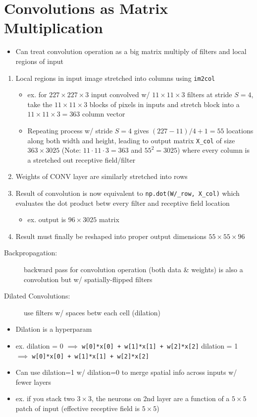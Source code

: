 \documentclass[a4paper,12pt]{article}
\begin{document}
\section{Convolutions as Matrix Multiplication}
\begin{itemize}
  \item Can treat convolution operation as a big matrix multiply of filters and local regions of input
\end{itemize}
\begin{enumerate}
  \item Local regions in input image stretched into columns using \lstinline{im2col}
  \begin{itemize}
    \item ex. for $227\times 227\times 3$ input convolved w/ $11\times 11\times 3$ filters at stride $S = 4$, take the $11\times 11\times 3$ blocks of pixels in inputs and stretch block into a $11\times 11\times 3 = 363$ column vector
    \item Repeating process w/ stride $S = 4$ gives $(227-11)/4 + 1 = 55 $ locations along both width and height, leading to output matrix \lstinline{X_col} of size $363\times 3025$ (Note: $11 \cdot 11\cdot3=363$ and $55^2 = 3025$) where every column is a stretched out receptive field/filter
  \end{itemize}
  \item Weights of CONV layer are similarly stretched into rows
  \item Result of convolution is now equivalent to \lstinline{np.dot(W/_row, X_col)} which evaluates the dot product betw every filter and receptive field location
  \begin{itemize}
    \item ex. output is $96\times 3025$ matrix
  \end{itemize}
  \item Result must finally be reshaped into proper output dimensions $55\times 55\times 96$
\end{enumerate}

\begin{description}
  \item[Backpropagation:] backward pass for convolution operation (both data \& weights) is also a convolution but w/ spatially-flipped filters
  \item[Dilated Convolutions:] use filters w/ spaces betw each cell (dilation)
\end{description}
\begin{itemize}
  \item Dilation is a hyperparam
  \item ex. dilation = 0 $\implies$ \lstinline{w[0]*x[0] + w[1]*x[1] + w[2]*x[2]}
  dilation = 1 $\implies$ \lstinline{w[0]*x[0] + w[1]*x[1] + w[2]*x[2]}
  \item Can use dilation=1 w/ dilation=0 to merge spatial info across inputs w/ fewer layers
  \item ex. if you stack two $3\times 3$, the neurons on 2nd layer are a function of a $5\times 5$ patch of input (effective receptive field is $5\times 5$)
\end{itemize}
\end{document}
